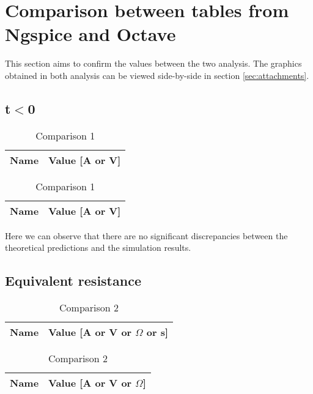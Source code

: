 \section{Comparison between tables from Ngspice and Octave} 
\label{sec:comparison}
This section aims to confirm the values between the two analysis. The graphics obtained in both analysis can be viewed side-by-side in section \ref{sec:attachments}.
\subsection{t$<$0}

\begin{table}[h]
\begin{center}
  \begin{tabular}{|c|c|}
    \hline    
    {\bf Name} & {\bf Value [A or V]} \\ \hline
    
    \hline
  \end{tabular}
  \begin{tabular}{|c||c|}
    \hline    
    {\bf Name} & {\bf Value [A or V]} \\ \hline
    
    \hline
  \end{tabular}
  \caption{Comparison 1}
  \label{tab:comparison 1}
\end{center}
\end{table}
\FloatBarrier

Here we can observe that there are no significant discrepancies between the theoretical predictions and the simulation results.

\subsection{Equivalent resistance}
\begin{table}[h]
\begin{center}
  \begin{tabular}{|c|c|}
    \hline    
    {\bf Name} & {\bf Value [A or V or $\Omega$ or s]} \\ \hline
    
    \hline
  \end{tabular}
  \begin{tabular}{|c||c|}
    \hline    
    {\bf Name} & {\bf Value [A or V or $\Omega$]} \\ \hline
    
    \hline
  \end{tabular}
  \caption{Comparison 2}
 \label{tab:comparison 2}
\end{center}
\end{table}
\FloatBarrier


